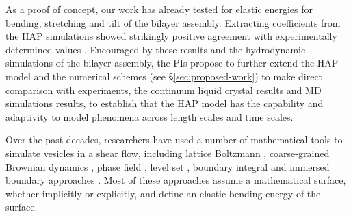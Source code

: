 As a proof of concept, our work has already tested for elastic energies for bending, stretching and tilt of the bilayer assembly.
Extracting coefficients from the HAP simulations showed strikingly
positive agreement with experimentally determined values
\cite{Fu2018_SIAM}.
Encouraged by these results and the hydrodynamic simulations of the bilayer assembly, the PIs propose to
further extend the HAP model and the numerical schemes (see \S\ref{sec:proposed-work})
to make direct comparison with experiments, the continuum liquid crystal results and MD simulations results, to establish that
the HAP model has the capability and adaptivity to model phenomena across length scales and time scales.

Over the past decades, researchers have used a number of mathematical tools 
to simulate vesicles in a shear flow, including  lattice Boltzmann \cite{KaouiHartingMisbah2011_PRE}, coarse-grained Brownian dynamics \cite{NoguchiTakasu2002_BJ},
phase field \cite{DuLiuWang2004_JCP,BibenKassnerMisbah2005_PRE}, 
level set \cite{DoyeuxGuyotChabannesEtAl2013_JCAM}, boundary integral \cite{Shravan09,Rahimian15} and 
immersed boundary approaches \cite{KimLai2010_JCP,KimLai2012_PRE,HuLaiSeolEtAl2016_JCP}. Most of these approaches
assume a mathematical surface, whether implicitly or explicitly, 
and define an elastic bending energy of the surface. 

